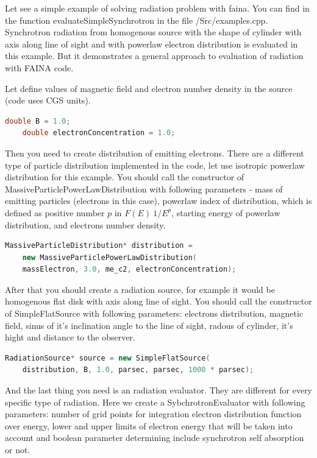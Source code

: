 Let see a simple example of solving radiation problem with faina. You can find in the function evaluateSimpleSynchrotron in the file /Src/examples.cpp. Synchrotron radiation from homogenous source with   the shape of cylinder with axis along line of sight and with powerlaw electron distribution is evaluated in this example. But it demonstrates a general approach to evaluation of radiation with FAINA code.

Let define values of magnetic field and electron number density in the source (code uses CGS units).

\begin{lstlisting}[language=c++]
	double B = 1.0;
	double electronConcentration = 1.0;
\end{lstlisting}

Then you need to create distribution of emitting electrons. There are a different type of particle distribution implemented in the code, let use isotropic powerlaw distribution for this example. You should call the constructor of MassiveParticlePowerLawDistribution with following parameters - mass of emitting particles (electrons in this case), powerlaw index of distribution, which is defined as positive number $p$ in $F(E) ~ 1/E^p$, starting energy of powerlaw distribution, and electrons number density. 

\begin{lstlisting}[language=c++]
	MassiveParticleDistribution* distribution =
	new MassiveParticlePowerLawDistribution(
	massElectron, 3.0, me_c2, electronConcentration);
\end{lstlisting}

After that you should create a radiation source, for example it would be homogenous flat disk with axis along line of sight. You should call the constructor of SimpleFlatSource with following parameters: electrons distribution, magnetic field, sinus of it's inclination angle to the line of sight, radous of cylinder, it's hight and distance to the observer.

\begin{lstlisting}[language=c++]
	RadiationSource* source = new SimpleFlatSource(
	distribution, B, 1.0, parsec, parsec, 1000 * parsec);
\end{lstlisting}

And the last thing you need is an radiation evaluator. They are different for every specific type of radiation. Here we create a SybchrotronEvaluator with following parameters: number of grid points for integration electron distribution function over energy, lower and upper limits of electron energy that will be taken into account and boolean parameter determining include synchrotron self absorption or not.

